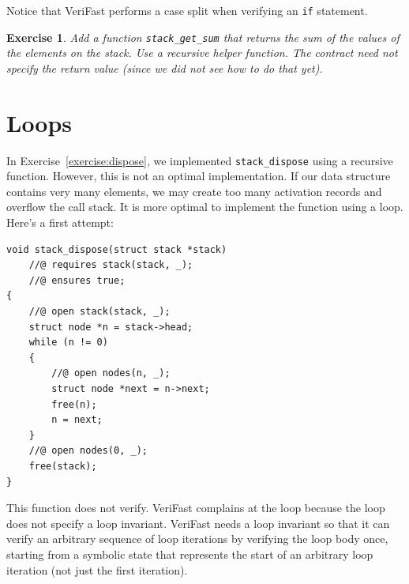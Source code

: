 \documentclass{article}
\newtheorem{exercise}{Exercise}
\begin{document}
Notice that VeriFast performs a case split when verifying an
\lstinline!if! statement.

\begin{exercise}\label{exercise:sum}
Add a function \lstinline!stack_get_sum! that returns the sum
of the values of the elements on the stack. Use a recursive
helper function. The contract need not specify the return value
(since we did not see how to do that yet).
\end{exercise}

\section{Loops}

In Exercise~\ref{exercise:dispose}, we implemented
\lstinline!stack_dispose! using a recursive function. However,
this is not an optimal implementation. If our data structure
contains very many elements, we may create too many activation
records and overflow the call stack. It is more optimal to
implement the function using a loop. Here's a first attempt:
\begin{lstlisting}
void stack_dispose(struct stack *stack)
    //@ requires stack(stack, _);
    //@ ensures true;
{
    //@ open stack(stack, _);
    struct node *n = stack->head;
    while (n != 0)
    {
        //@ open nodes(n, _);
        struct node *next = n->next;
        free(n);
        n = next;
    }
    //@ open nodes(0, _);
    free(stack);
}
\end{lstlisting}
This function does not verify. VeriFast complains at the loop
because the loop does not specify a loop invariant. VeriFast
needs a loop invariant so that it can verify an arbitrary
sequence of loop iterations by verifying the loop body once,
starting from a symbolic state that represents the start of an
arbitrary loop iteration (not just the first iteration).
\end{document}
